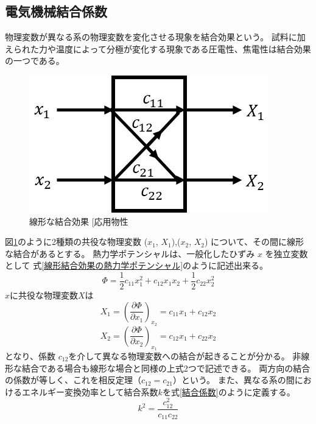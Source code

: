 \documentclass[dvipdfmx,12pt,a4paper]{jreport}
\makeatletter
\DeclareRobustCommand\cite{\unskip
    	\@ifnextchar[{\@tempswatrue\@citex}{\@tempswafalse\@citex[]}}
\makeatother
\begin{document}
			\subsection{電気機械結合係数}
			物理変数が異なる系の物理変数を変化させる現象を結合効果という。
			試料に加えられた力や温度によって分極が変化する現象である圧電性、焦電性は結合効果の一つである。
			\begin{figure}[h]
				\centering
				\includegraphics{結合効果.jpg}
				\caption{線形な結合効果\cite{応用物性}}
				\label{結合効果}
			\end{figure}

			図\ref{結合効果}のように2種類の共役な物理変数 ($x_1$, $X_1$),($x_2$, $X_2$)
			について、その間に線形な結合があるとする。
			熱力学ポテンシャルは、一般化したひずみ $x$ を独立変数として
			式\eqref{線形結合効果の熱力学ポテンシャル}のように記述出来る。
			\begin{equation}
				\Phi=\frac{1}{2}c_{11}x_1^2 + c_{12}x_1x_2+\frac{1}{2}c_{22}x_2^2
				\label{線形結合効果の熱力学ポテンシャル}
			\end{equation}
			$x$に共役な物理変数$X$は
			\begin{equation}
				X_1 = \left( \frac{\partial \Phi}{\partial x_1} \right)_{x_2} = c_{11}x_1+c_{12}x_2
			\end{equation}
			\begin{equation}
				X_2 = \left( \frac{\partial \Phi}{\partial x_2} \right)_{x_1} = c_{12}x_1 + c_{22}x_2
			\end{equation}
			となり、係数 $c_{12}$を介して異なる物理変数への結合が起きることが分かる。
			非線形な結合である場合も線形な場合と同様の上式2つで記述できる。
			両方向の結合の係数が等しく、これを相反定理（$c_{12}=c_{21}$）という。
			また、異なる系の間におけるエネルギー変換効率として結合系数$k$を式\eqref{結合係数}のように定義する。
			\begin{equation}
				k^2=\frac{c_{12}^2}{c_{11}c_{22}}
				\label{結合係数}
			\end{equation}
			
\end{document}
